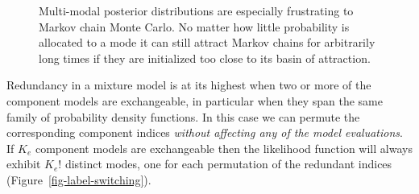 \documentclass[
  letterpaper,
  DIV=11,
  numbers=noendperiod]{scrartcl}
\begin{document}
\begin{figure}


\caption{\label{fig-multimodal}Multi-modal posterior distributions are
especially frustrating to Markov chain Monte Carlo. No matter how little
probability is allocated to a mode it can still attract Markov chains
for arbitrarily long times if they are initialized too close to its
basin of attraction.}

\end{figure}%

Redundancy in a mixture model is at its highest when two or more of the
component models are exchangeable, in particular when they span the same
family of probability density functions. In this case we can permute the
corresponding component indices \emph{without affecting any of the model
evaluations}. If \(K_{e}\) component models are exchangeable then the
likelihood function will always exhibit \(K_{e}!\) distinct modes, one
for each permutation of the redundant indices
(Figure~\ref{fig-label-switching}).
\end{document}
